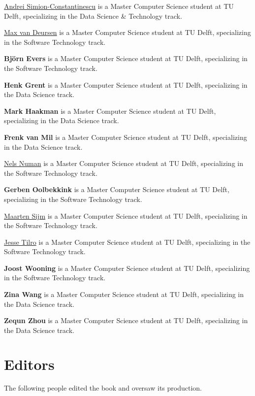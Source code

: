 \documentclass[]{book}
\begin{document}
\href{https://www.linkedin.com/in/andrei-simion-constantinescu/}{Andrei
Simion-Constantinescu} is a Master Computer Science student at TU Delft,
specializing in the Data Science \& Technology track.

\href{http://maxvandeursen.nl}{Max van Deursen} is a Master Computer
Science student at TU Delft, specializing in the Software Technology
track.

\textbf{Björn Evers} is a Master Computer Science student at TU Delft,
specializing in the Software Technology track.

\textbf{Henk Grent} is a Master Computer Science student at TU Delft,
specializing in the Data Science track.

\textbf{Mark Haakman} is a Master Computer Science student at TU Delft,
specializing in the Data Science track.

\textbf{Frenk van Mil} is a Master Computer Science student at TU Delft,
specializing in the Data Science track.

\href{https://www.linkedin.com/in/nsalminen/}{Nels Numan} is a Master
Computer Science student at TU Delft, specializing in the Software
Technology track.

\textbf{Gerben Oolbekkink} is a Master Computer Science student at TU
Delft, specializing in the Software Technology track.

\href{https://www.linkedin.com/in/mpsijm/}{Maarten Sijm} is a Master
Computer Science student at TU Delft, specializing in the Software
Technology track.

\href{https://www.linkedin.com/in/jesse-tilro/}{Jesse Tilro} is a Master
Computer Science student at TU Delft, specializing in the Software
Technology track.

\textbf{Joost Wooning} is a Master Computer Science student at TU Delft,
specializing in the Software Technology track.

\textbf{Zina Wang} is a Master Computer Science student at TU Delft,
specializing in the Data Science track.

\textbf{Zequn Zhou} is a Master Computer Science student at TU Delft,
specializing in the Data Science track.

\section*{Editors}\label{editors}

The following people edited the book and oversaw its production.
\end{document}
